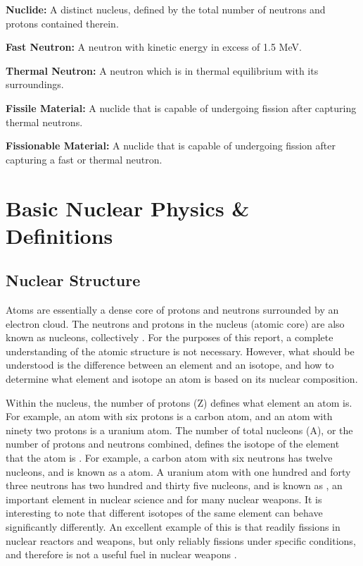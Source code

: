 \documentclass{report}
\begin{document}
\textbf{Nuclide:} A distinct nucleus, defined by the total number of neutrons and protons contained therein.  

\textbf{Fast Neutron:} A neutron with kinetic energy in excess of 1.5 MeV.

\textbf{Thermal Neutron:} A neutron which is in thermal equilibrium with its surroundings. 

\textbf{Fissile Material:} A nuclide that is capable of undergoing fission after capturing thermal neutrons.

\textbf{Fissionable Material:} A nuclide that is capable of undergoing fission after capturing a fast or thermal neutron.



\chapter[Appendix B: Basic Nuclear Physics \& Definitions]{Basic Nuclear Physics \& Definitions}  \label{app:physics}



\section{Nuclear Structure}

Atoms are essentially a dense core of protons and neutrons surrounded by an electron cloud. The neutrons and protons in the nucleus (atomic core) are also known as nucleons, collectively \cite{krane1987introductory}. For the purposes of this report, a complete understanding of the atomic structure is not necessary. However, what should be understood is the difference between an element and an isotope, and how to determine what element and isotope an atom is based on its nuclear composition. 

Within the nucleus, the number of protons (Z) defines what element an atom is. For example, an atom with six protons is a carbon atom, and an atom with ninety two protons is a uranium atom. The number of total nucleons (A), or the number of protons and neutrons combined, defines the isotope of the element that the atom is \cite{krane1987introductory}. For example, a carbon atom with six neutrons has twelve nucleons, and is known as a  atom. A uranium atom with one hundred and forty three neutrons has two hundred and thirty five nucleons, and is known as , an important element in nuclear science and for many nuclear weapons. It is interesting to note that different isotopes of the same element can behave significantly differently. An excellent example of this is that  readily fissions in nuclear reactors and weapons, but  only reliably fissions under specific conditions, and therefore is not a useful fuel in nuclear weapons \cite{krane1987introductory,Duderstadt1976}. 
\end{document}
